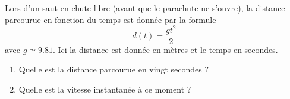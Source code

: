 
\begin{exercice}\label{exosmath-0404}

    Lors d'un saut en chute libre (avant que le parachute ne s'ouvre), la distance parcourue en fonction du temps est donnée par la formule
    \begin{equation}
        d(t)=\frac{ gt^2 }{2}
    \end{equation}
    avec \( g\simeq 9.81\). Ici la distance est donnée en mètres et le temps en secondes.
    \begin{enumerate}
        \item
            Quelle est la distance parcourue en vingt secondes ?
        \item
            Quelle est la vitesse instantanée à ce moment ?
    \end{enumerate}

\end{exercice}
